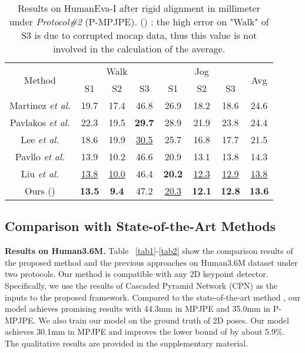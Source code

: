 \documentclass[sigconf]{acmart}
\begin{document}
\begin{table}\small
  \centering
  \caption{Results on HumanEva-I after rigid alignment in millimeter under \textit{Protocol\#2} (P-MPJPE). (\textsuperscript{}) : the high error on "Walk" of S3 is due to corrupted mocap data, thus this value is not involved in the calculation of the average. }
\begin{tabular}{c|ccc|ccc|c}
    \toprule
   \multirow{2}{*}{Method}   & \multicolumn{3}{c|}{Walk} &\multicolumn{3}{c|}{Jog} &\multirow{2}{*}{Avg} \\

    &S1&S2&S3&S1&S2&S3\\
    \midrule
    
    Martinez \textit{et al.} \cite{martinez2017simple} & 19.7&17.4&46.8&26.9&18.2&18.6&24.6 \\
    Pavlakos \textit{et al.} \cite{pavlakos2017coarse} & 22.3&19.5&\textbf{29.7}&28.9&21.9&23.8&24.4 \\
    Lee \textit{et al.} \cite{lee2018propagating}&18.6&19.9&\underline{30.5}&25.7&16.8&17.7&21.5\\
    Pavllo \textit{et al.} \cite{jllo20193d} &13.9&10.2&46.6\textsuperscript{}&20.9&13.1&13.8&14.3 \\
    Liu \textit{et al.} \cite{liu2020attention}&\underline{13.8}&\underline{10.0}&46.4\textsuperscript{}&\textbf{20.2}&\underline{12.3}&\underline{12.9}&\underline{13.8}\\


    \midrule
    Ours () &\textbf{13.5}&\textbf{9.4}&47.2\textsuperscript{}&\underline{20.3}&\textbf{12.1}&\textbf{12.8}&\textbf{13.6} \\
    \bottomrule
    \end{tabular}
    \vspace{-0.3cm}
  \label{tab3}
\end{table}


\subsection{Comparison with State-of-the-Art Methods}
\textbf{Results on Human3.6M.} Table ~\ref{tab1}-\ref{tab2} show the comparison results of the proposed method and the previous approaches on Human3.6M dataset under two protocols. Our method is compatible with any 2D keypoint detector. Specifically, we use the results of Cascaded Pyramid Network (CPN)  \cite{chen2018cascaded} as the inputs to the proposed framework. Compared to the state-of-the-art method \cite{zeng2020srnet}, our model achieves promising results with 44.3mm in MPJPE and 35.0mm in P-MPJPE. We also train our model on the ground truth of 2D poses. Our model achieves 30.1mm in MPJPE and improves the lower bound of \cite{zeng2020srnet} by about 5.9\%. The qualitative results are provided in the supplementary material.
\end{document}
